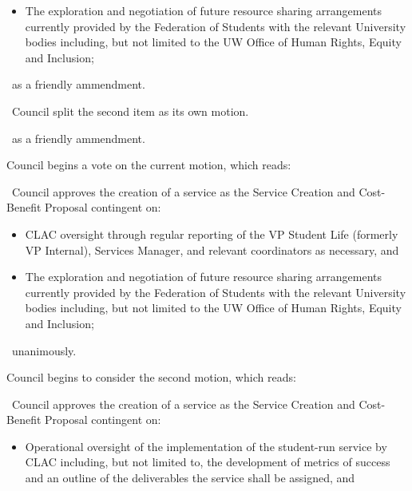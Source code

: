 \begin{motion}
\begin{motion}
\begin{motion}
\begin{itemize}
                \item The exploration and negotiation of future resource sharing
                    arrangements currently provided by the Federation of Students with
                    the relevant University bodies including, but not limited to the UW
                    Office of Human Rights, Equity and Inclusion;

            \end{itemize}

            \carries\ as a friendly ammendment.
        \end{motion}

        \begin{motion}
            \birt\ Council split the second item as its own motion.

            \carries\ as a friendly ammendment.
        \end{motion}

        Council begins a vote on the current motion, which reads:
        \begin{motion}
            \birt\ Council approves the creation of a service as the Service Creation
            and Cost-Benefit Proposal contingent on:

            \begin{itemize}
                \item CLAC oversight through regular reporting of the VP Student
                    Life (formerly VP Internal), Services Manager, and relevant
                    coordinators as necessary, and 

                \item The exploration and negotiation of future resource sharing
                    arrangements currently provided by the Federation of Students with
                    the relevant University bodies including, but not limited to the UW
                    Office of Human Rights, Equity and Inclusion;

            \end{itemize}
        \end{motion}

        \carries\ unanimously.
    \end{motion}

    Council begins to consider the second motion, which reads:
    \begin{motion}
        \birt\ Council approves the creation of a service as the Service Creation
        and Cost-Benefit Proposal contingent on:
        \begin{itemize}
            \item Operational oversight of the implementation of the
                student-run service by CLAC including, but not limited to, the
                development of metrics of success and an outline of the
                deliverables the service shall be assigned, and
        \end{itemize}


\end{motion}
\end{motion}
